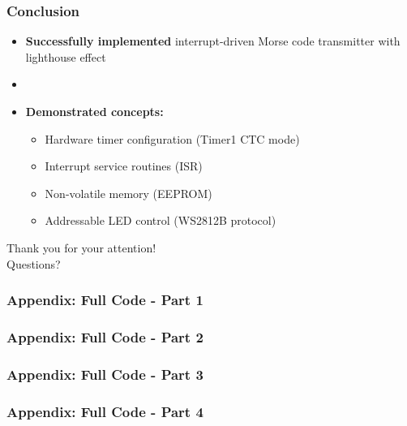 \documentclass[aspectratio=169, 8pt]{beamer}
\begin{document}
	\begin{frame}[fragile,shrink=10]
		\frametitle{Conclusion}
		\begin{itemize}
			\item \textbf{Successfully implemented} interrupt-driven Morse code transmitter with lighthouse effect
			\item[] 
			\item \textbf{Demonstrated concepts:}
			\begin{itemize}
				\item Hardware timer configuration (Timer1 CTC mode)
				\item Interrupt service routines (ISR)
				\item Non-volatile memory (EEPROM)
				\item Addressable LED control (WS2812B protocol)
			\end{itemize}
		\end{itemize}
		
		\vspace{1cm}
		\begin{center}
			\Large{Thank you for your attention!}\\
			\vspace{0.5cm}
			\normalsize{Questions?}
		\end{center}
	\end{frame}
	
	\begin{frame}[fragile, shrink=10]
		\frametitle{Appendix: Full Code - Part 1}
		
	\end{frame}

	\begin{frame}[fragile, shrink=10]
		\frametitle{Appendix: Full Code - Part 2}
		
	\end{frame}

	\begin{frame}[fragile, shrink=10]
		\frametitle{Appendix: Full Code - Part 3}
		
	\end{frame}

	\begin{frame}[fragile, shrink=10]
		\frametitle{Appendix: Full Code - Part 4}
		
	\end{frame}
\end{document}

